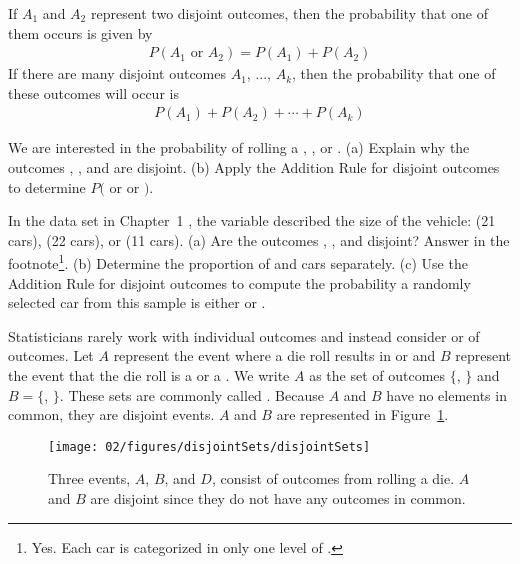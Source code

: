 \begin{termBox}{ If $A_1$ and $A_2$ represent two disjoint outcomes, then the probability that one of them occurs is given by
\begin{eqnarray*}
P(A_1\text{ or } A_2) = P(A_1) + P(A_2)
\end{eqnarray*}
If there are many disjoint outcomes $A_1$, ..., $A_k$, then the probability that one of these outcomes will occur is
\begin{eqnarray}
P(A_1) + P(A_2) + \cdots + P(A_k)
\end{eqnarray}
}
\end{termBox}

\begin{exercise}
We are interested in the probability of rolling a , , or . (a) Explain why the outcomes , , and  are disjoint. (b) Apply the Addition Rule for disjoint outcomes to determine $P($ or  or $)$.
\end{exercise}

\begin{exercise}
In the  data set in Chapter~1%
, the  variable described the size of the vehicle:  (21 cars),  (22 cars), or  (11 cars). (a) Are the outcomes , , and  disjoint? Answer in the footnote\footnote{Yes. Each car is categorized in only one level of .}. (b) Determine the proportion of  and  cars separately. (c) Use the Addition Rule for disjoint outcomes to compute the probability a randomly selected car from this sample is either  or .
\end{exercise}

Statisticians rarely work with individual outcomes and instead consider  or  of outcomes. Let $A$ represent the event where a die roll results in  or  and $B$ represent the event that the die roll is a  or a . We write $A$ as the set of outcomes $\{$, $\}$ and $B=\{$, $\}$. These sets are commonly called . Because $A$ and $B$ have no elements in common, they are disjoint events. $A$ and $B$ are represented in Figure~\ref{disjointSets}.
\begin{figure}[hhh]
\centering
\texttt{[image: 02/figures/disjointSets/disjointSets]}
\caption{Three events, $A$, $B$, and $D$, consist of outcomes from rolling a die. $A$ and $B$ are disjoint since they do not have any outcomes in common.}
\label{disjointSets}
\end{figure}

